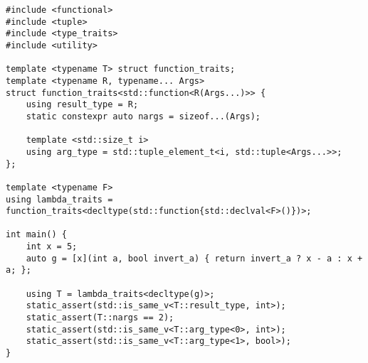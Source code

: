 \begin{lstlisting}[title=\href{https://godbolt.org/z/c6j8YY}{\texttt{godbolt.org/z/c6j8YY}}]
#include <functional>
#include <tuple>
#include <type_traits>
#include <utility>

template <typename T> struct function_traits;
template <typename R, typename... Args> 
struct function_traits<std::function<R(Args...)>> {
    using result_type = R;
    static constexpr auto nargs = sizeof...(Args);

    template <std::size_t i>
    using arg_type = std::tuple_element_t<i, std::tuple<Args...>>;
};

template <typename F>
using lambda_traits = function_traits<decltype(std::function{std::declval<F>()})>;

int main() {
    int x = 5;
    auto g = [x](int a, bool invert_a) { return invert_a ? x - a : x + a; };

    using T = lambda_traits<decltype(g)>;
    static_assert(std::is_same_v<T::result_type, int>);
    static_assert(T::nargs == 2);
    static_assert(std::is_same_v<T::arg_type<0>, int>);
    static_assert(std::is_same_v<T::arg_type<1>, bool>);
}
\end{lstlisting}

